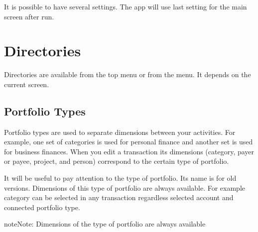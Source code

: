 \documentclass[a4paper,10pt,english]{sphinxmanual}
\begin{document}
\noindent{}

\sphinxAtStartPar
It is possible to have several settings. The app will use last setting for the main screen
after run.

\sphinxstepscope


\chapter{Directories}
\label{\detokenize{directories:directories}}\label{\detokenize{directories:chapter-directories}}\label{\detokenize{directories::doc}}
\sphinxAtStartPar
Directories are available from the top menu or from the  menu.
It depends on the current screen.

\noindent{}

\noindent{}


\section{Portfolio Types}
\label{\detokenize{directories:portfolio-types}}
\sphinxAtStartPar
Portfolio types are used to separate dimensions between your activities. For example, one set of
categories is used for personal finance and another set is used for business finances. When you
edit a transaction its dimensions (category,  payer or payee, project, and person) correspond
to the certain type of portfolio.

\noindent{}

\noindent{}

\noindent{}

\sphinxAtStartPar
It will be useful to pay attention to the  type of portfolio. Its name is 
for old versions. Dimensions of this type of portfolio are always available. For example 
category can be selected in any transaction regardless selected account and connected portfolio type.

\begin{sphinxadmonition}{note}{Note:}
\sphinxAtStartPar
Dimensions of the  type of portfolio are always available
\end{sphinxadmonition}
\end{document}
